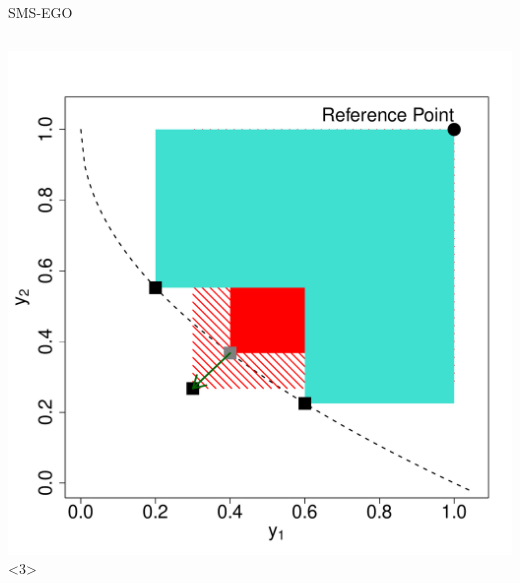 \documentclass[11pt,compress,t,notes=noshow, xcolor=table]{beamer}
\begin{document}
\begin{frame}{SMS-EGO}
\begin{columns}
\begin{column}{0.45\textwidth}
\includegraphics[page = 1]{figure_man/sms_plot.pdf}<3>

\end{column}

\end{columns}
\end{frame}

\endlecture
\end{document}
